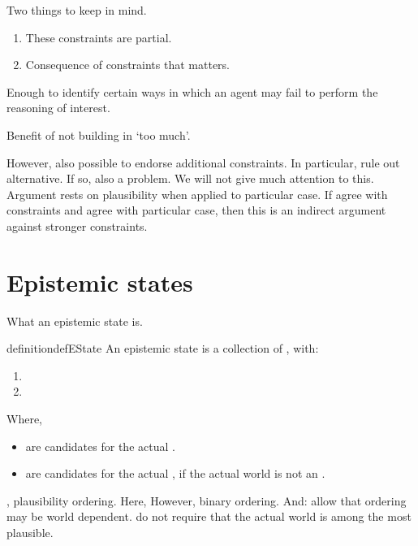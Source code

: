 \begin{note}
  Two things to keep in mind.

  \begin{enumerate}
  \item These constraints are partial.
  \item Consequence of constraints that matters.
  \end{enumerate}

  Enough to identify certain ways in which an agent may fail to perform the reasoning of interest.

  Benefit of not building in `too much'.

  However, also possible to endorse additional constraints.
  In particular, rule out alternative.
  If so, also a problem.
  We will not give much attention to this.
  Argument rests on plausibility when applied to particular case.
  If agree with constraints and agree with particular case, then this is an indirect argument against stronger constraints.
\end{note}

\section{Epistemic states}
\label{sec:epistemic-states}

\begin{note}
  What an epistemic state is.
\end{note}

\begin{note}
  \begin{restatable}{definition}{defEState}
    An epistemic state is a collection of , with:
    \begin{enumerate}
    \item {}
    \item {}
    \end{enumerate}
    Where,
    \begin{itemize}
    \item {} are candidates for the actual \world{}.
    \item {} are candidates for the actual \world{}, if the actual world is not an .
    \end{itemize}
  \end{restatable}
\end{note}

\begin{note}
  , plausibility ordering.
  Here,
  However, binary ordering.
  And:
  allow that ordering may be world dependent.
  do not require that the actual world is among the most plausible.
\end{note}

